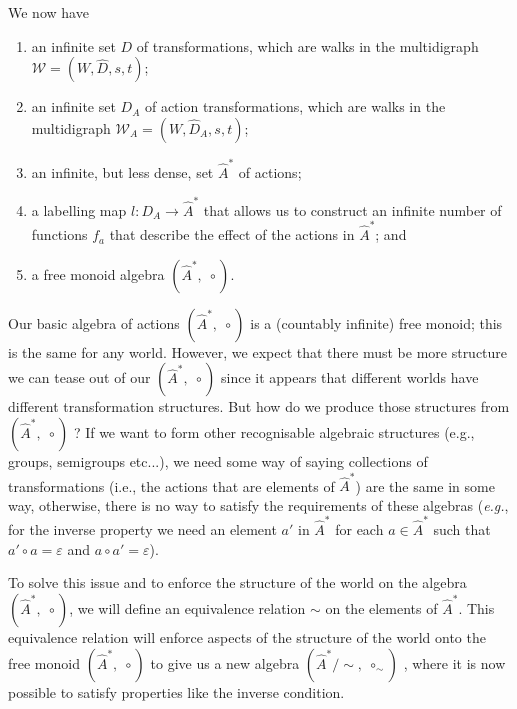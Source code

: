 We now have 
\begin{enumerate}
	\item an infinite set $D$ of transformations, which are walks in the multidigraph $\mathscr{W}=(W, \hat{D}, s, t)$;

	\item an infinite set $D_{A}$ of action transformations, which are walks in the multidigraph $\mathscr{W}_{A}=(W, \hat{D}_{A}, s, t)$;

	\item an infinite, but less dense, set $\hat{A}^{\ast}$ of actions;

	\item a labelling map $l: D_{A} \to \hat{A}^{\ast}$ that allows us to construct an infinite number of functions $f_{a}$ that describe the effect of the actions in $\hat{A}^{\ast}$; and

	\item a free monoid algebra $(\hat{A}^{\ast}, \; \circ)$.
\end{enumerate}


Our basic algebra of actions $(\hat{A}^{\ast}, \; \circ)$ is a (countably infinite) free monoid; this is the same for any world.
However, we expect that there must be more structure we can tease out of our $(\hat{A}^{\ast}, \; \circ)$ since it appears that different worlds have different transformation structures.
But how do we produce those structures from $(\hat{A}^{\ast}, \; \circ)$ ?
If we want to form other recognisable algebraic structures (e.g., groups, semigroups etc...), we need some way of saying collections of transformations (i.e., the actions that are elements of $\hat{A}^{\ast}$) are the same in some way, otherwise, there is no way to satisfy the requirements of these algebras (\textit{e.g.}, for the inverse property we need an element $a'$ in $\hat{A}^{\ast}$ for each $a \in \hat{A}^{\ast}$ such that $a' \circ a = \varepsilon$ and $a \circ a' = \varepsilon$).

To solve this issue and to enforce the structure of the world on the algebra $(\hat{A}^{\ast}, \; \circ)$, we will define an equivalence relation $\sim$ on the elements of $\hat{A}^{\ast}$.
This equivalence relation will enforce aspects of the structure of the world onto the free monoid $(\hat{A}^{\ast}, \; \circ)$ to give us a new algebra $(\hat{A}^{\ast}/\sim, \; \circ_{\sim})$ , where it is now possible to satisfy properties like the inverse condition.

